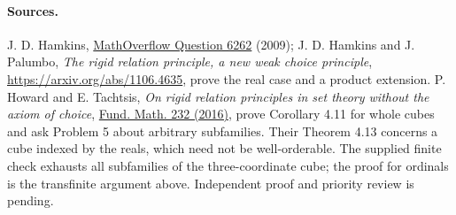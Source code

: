 \documentclass[11pt]{article}
\begin{document}
\paragraph{Sources.} J. D. Hamkins, \href{https://mathoverflow.net/questions/6262}{MathOverflow Question 6262} (2009); J. D. Hamkins and J. Palumbo, \emph{The rigid relation principle, a new weak choice principle}, \url{https://arxiv.org/abs/1106.4635}, prove the real case and a product extension. P. Howard and E. Tachtsis, \emph{On rigid relation principles in set theory without the axiom of choice}, \href{https://doi.org/10.4064/fm960-12-2015}{Fund. Math. 232 (2016)}, prove Corollary 4.11 for whole cubes and ask Problem 5 about arbitrary subfamilies. Their Theorem 4.13 concerns a cube indexed by the reals, which need not be well-orderable. The supplied finite check exhausts all subfamilies of the three-coordinate cube; the proof for ordinals is the transfinite argument above. Independent proof and priority review is pending.
\end{document}
